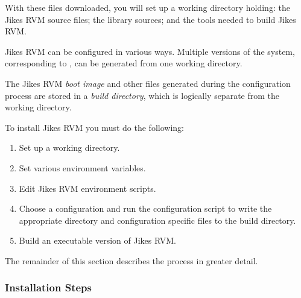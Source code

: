 With these files downloaded, you will set up 
a working directory holding: the Jikes RVM source files; the 
library sources; and the tools needed to build Jikes RVM.\@ 

%
Jikes RVM can be configured in various ways.  Multiple versions of the system,
corresponding to , can be generated from 
one working directory.   

The Jikes RVM {\em boot image} and other files generated during the 
configuration process
are stored in a {\em build directory},
 which is logically separate from the working directory. 

To install Jikes RVM  you must do the following:
\begin{enumerate}
\item Set up a working directory.
\item Set various environment variables.
\item Edit Jikes RVM environment scripts.
\item Choose a configuration and run the configuration script to write
the appropriate directory and configuration specific files to the
build directory.
\item Build an executable version of Jikes RVM.\@
\end{enumerate}

The remainder of this section describes the process in greater detail.

\subsubsection{Installation Steps}%
\label{sub-sub-sec:InstallationSteps}%
\label{sec:manual-classpath-root}%
\label{single-virtual-processor-subsubsection}

